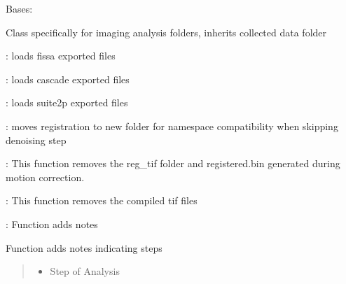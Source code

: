\documentclass[letterpaper,10pt,english]{sphinxmanual}
\begin{document}
\begin{fulllineitems}
\label{\detokenize{Organization:Organization.ImagingAnalysis}}
\pysigstartsignatures
{}
\pysigstopsignatures
\sphinxAtStartPar
Bases: {\hyperref[\detokenize{Organization:Organization.Data}]{}}

\sphinxAtStartPar
Class specifically for imaging analysis folders, inherits collected data folder
\begin{description}
\begin{DUlineblock}{0em}
\item[]  : loads fissa exported files
\item[]  : loads cascade exported files
\item[]  : loads suite2p exported files
\item[]  : moves registration to new folder for namespace compatibility when skipping denoising step
\item[]  : This function removes the reg\_tif folder and registered.bin generated during motion correction.
\item[]  : This function removes the compiled tif files
\item[]  : Function adds notes
\end{DUlineblock}

\end{description}

\begin{fulllineitems}
\label{\detokenize{Organization:Organization.ImagingAnalysis.add_notes}}
\pysigstartsignatures
{}
\pysigstopsignatures
\sphinxAtStartPar
Function adds notes indicating steps
\begin{quote}\begin{description}
\begin{itemize}
\item {} 
\sphinxAtStartPar
{} \textendash{} Step of Analysis


\end{itemize}
\end{description}
\end{quote}
\end{fulllineitems}
\end{fulllineitems}
\end{document}
